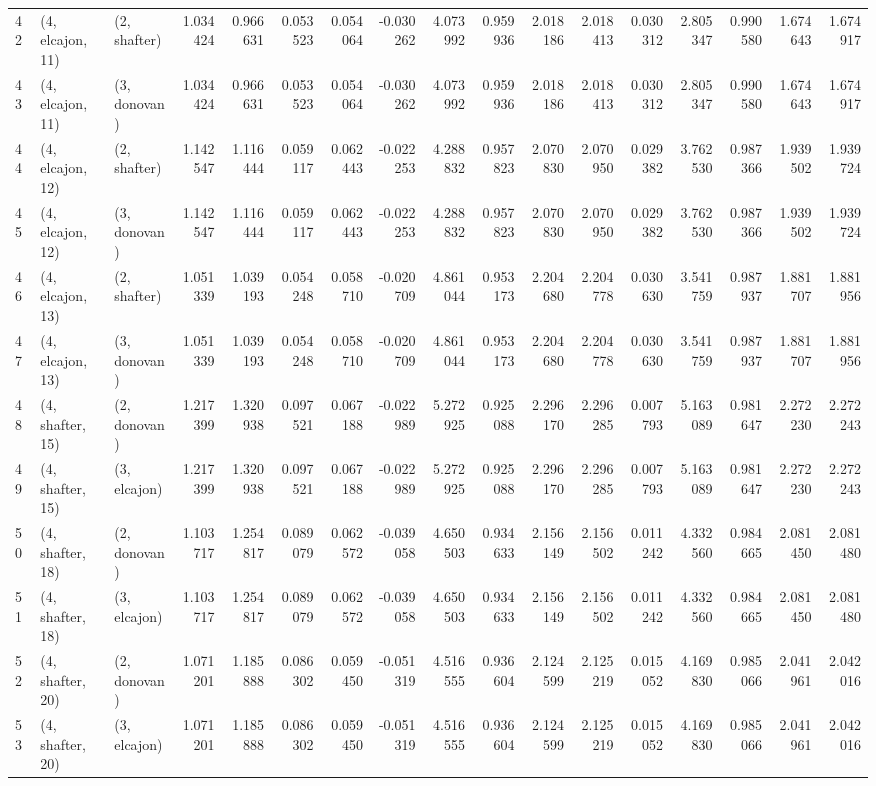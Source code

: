 \begin{tabular}{lllrrrrrrrrrrrrrr}
42 &  (4, elcajon, 11) &     (2, shafter) &  1.034424 &  0.966631 &   0.053523 &  0.054064 & -0.030262 &   4.073992 &  0.959936 &   2.018186 &  2.018413 &  0.030312 &   2.805347 &  0.990580 &  1.674643 &  1.674917 \\
43 &  (4, elcajon, 11) &     (3, donovan) &  1.034424 &  0.966631 &   0.053523 &  0.054064 & -0.030262 &   4.073992 &  0.959936 &   2.018186 &  2.018413 &  0.030312 &   2.805347 &  0.990580 &  1.674643 &  1.674917 \\
44 &  (4, elcajon, 12) &     (2, shafter) &  1.142547 &  1.116444 &   0.059117 &  0.062443 & -0.022253 &   4.288832 &  0.957823 &   2.070830 &  2.070950 &  0.029382 &   3.762530 &  0.987366 &  1.939502 &  1.939724 \\
45 &  (4, elcajon, 12) &     (3, donovan) &  1.142547 &  1.116444 &   0.059117 &  0.062443 & -0.022253 &   4.288832 &  0.957823 &   2.070830 &  2.070950 &  0.029382 &   3.762530 &  0.987366 &  1.939502 &  1.939724 \\
46 &  (4, elcajon, 13) &     (2, shafter) &  1.051339 &  1.039193 &   0.054248 &  0.058710 & -0.020709 &   4.861044 &  0.953173 &   2.204680 &  2.204778 &  0.030630 &   3.541759 &  0.987937 &  1.881707 &  1.881956 \\
47 &  (4, elcajon, 13) &     (3, donovan) &  1.051339 &  1.039193 &   0.054248 &  0.058710 & -0.020709 &   4.861044 &  0.953173 &   2.204680 &  2.204778 &  0.030630 &   3.541759 &  0.987937 &  1.881707 &  1.881956 \\
48 &  (4, shafter, 15) &     (2, donovan) &  1.217399 &  1.320938 &   0.097521 &  0.067188 & -0.022989 &   5.272925 &  0.925088 &   2.296170 &  2.296285 &  0.007793 &   5.163089 &  0.981647 &  2.272230 &  2.272243 \\
49 &  (4, shafter, 15) &     (3, elcajon) &  1.217399 &  1.320938 &   0.097521 &  0.067188 & -0.022989 &   5.272925 &  0.925088 &   2.296170 &  2.296285 &  0.007793 &   5.163089 &  0.981647 &  2.272230 &  2.272243 \\
50 &  (4, shafter, 18) &     (2, donovan) &  1.103717 &  1.254817 &   0.089079 &  0.062572 & -0.039058 &   4.650503 &  0.934633 &   2.156149 &  2.156502 &  0.011242 &   4.332560 &  0.984665 &  2.081450 &  2.081480 \\
51 &  (4, shafter, 18) &     (3, elcajon) &  1.103717 &  1.254817 &   0.089079 &  0.062572 & -0.039058 &   4.650503 &  0.934633 &   2.156149 &  2.156502 &  0.011242 &   4.332560 &  0.984665 &  2.081450 &  2.081480 \\
52 &  (4, shafter, 20) &     (2, donovan) &  1.071201 &  1.185888 &   0.086302 &  0.059450 & -0.051319 &   4.516555 &  0.936604 &   2.124599 &  2.125219 &  0.015052 &   4.169830 &  0.985066 &  2.041961 &  2.042016 \\
53 &  (4, shafter, 20) &     (3, elcajon) &  1.071201 &  1.185888 &   0.086302 &  0.059450 & -0.051319 &   4.516555 &  0.936604 &   2.124599 &  2.125219 &  0.015052 &   4.169830 &  0.985066 &  2.041961 &  2.042016 \\
\bottomrule
\end{tabular}
